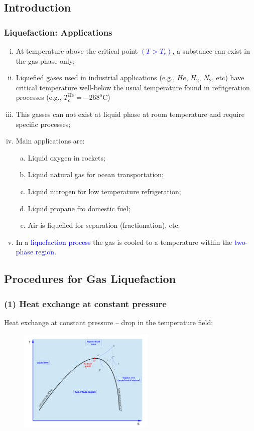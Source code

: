 \documentclass[10pt,compress]{beamer}
\begin{document}
\subsection{Introduction}
\begin{frame}
 \frametitle{Liquefaction: Applications}
  \begin{enumerate}[(i)]
   \item <1-> At temperature above the critical point \textcolor{blue}{$\left(T>T_{c}\right)$}, a substance can exist in the gas phase only;
   \item <2-> Liquefied gases used in industrial applications (e.g., $He$, $H_{2}$, $N_{2}$, etc) have critical temperature well-below the usual temperature found in refrigeration processes (e.g., $T_{c}^{\text{He}}=-268^{\text{o}}\text{C}$)
   \item <3-> This gasses can not exist at liquid phase at room temperature and require specific processes;
   \item <4-> Main applications are:
    \begin{enumerate}[(a)]
     \item <5-> Liquid oxygen in rockets;
     \item <6-> Liquid natural gas for ocean transportation;
     \item <7-> Liquid nitrogen for low temperature refrigeration;
     \item <8-> Liquid propane fro domestic fuel;
     \item <9-> Air is liquefied for separation (fractionation), etc;
    \end{enumerate}
   \item <10-> In a \textcolor{blue}{liquefaction process} the gas is cooled to a temperature within the \textcolor{blue}{two-phase region}.
  \end{enumerate}
\end{frame}

\subsection{Procedures for Gas Liquefaction}
\begin{frame}
 \frametitle{(1) Heat exchange at constant pressure}
Heat exchange at constant pressure -- drop in the temperature field;

    \begin{figure}%
     \begin{center}
      \includegraphics[width=6.5cm,clip]{./Pics/Overview_Refrig38}
     \end{center}
    \end{figure} 
\end{frame}
\end{document}
